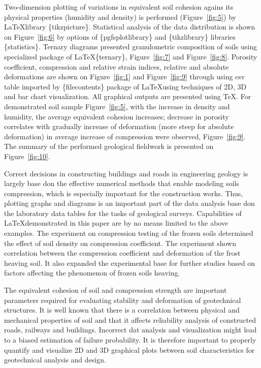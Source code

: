 \documentclass[a4paper,10pt]{article}
\begin{document}
Two-dimension plotting of variations in equivalent soil cohesion agains its physical properties (humidity and density) is performed (Figure~\ref{fig:5}) by \LaTeX \space library \{tikzpicture\}. Statistical analysis of the data distribution is shown on Figure~\ref{fig:6} by options of \{pgfsplotlibrary\} and \{tikzlibrary\} \space libraries \{statistics\}.  Ternary diagrams presented granulometric composition of soils using specialized package of \LaTeX \space \{ternary\}, Figure~\ref{fig:7} and Figure~\ref{fig:8}. Porosity coefficient, compression and relative strain indices, relative and absolute deformations are shown on Figure~\ref{fig:1} and Figure~\ref{fig:9} through using csv table imported by \{filecontents\} package of \LaTeX \space using techniques of 2D, 3D and bar chart visualization. 
All graphical outputs are presented using \TeX. For demonstrated soil sample Figure~\ref{fig:5}, with the increase in density and humidity, the average equivalent cohesion increases; decrease in porosity correlates with gradually increase of deformation (more steep for absolute deformation) in average increase of compression were observed, Figure~\ref{fig:9}.  The summary of the performed geological fieldwork is presented on Figure~\ref{fig:10}. 

Correct decisions in constructing buildings and roads in engineering geology is largely base don the effective numerical methods that enable modeling soils compression, which is especially important for the construction works. Thus, plotting graphs and diagrams is an important part of the data analysis base don the laboratory data tables for the tasks of geological surveys. Capabilities of \LaTeX \space demonstrated in this paper are by no means limited to the above examples. The experiment on compression testing of the frozen soils determined the effect of soil density on compression coefficient. The experiment shown correlation between the compression coefficient and deformation of the frost heaving soil. It also expanded the experimental base for further studies based on factors affecting the phenomenon of frozen soils heaving. 

The equivalent cohesion of soil and compression strength are important parameters required for evaluating stability and deformation of geotechnical structures. It is well known that there is a correlation between physical and mechanical properties of soil and that it affects reliability analysis of constructed roads, railways and buildings. Incorrect dat analysis and visualization might lead to a biased estimation of failure probability. It is therefore important to properly quantify and visualize 2D and 3D graphical plots between soil characteristics for geotechnical analysis and design.
\end{document}
